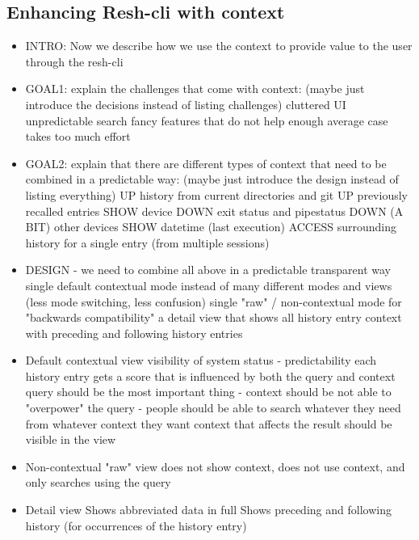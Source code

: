 \documentclass[thesis=M,english]{FITthesis}[2012/10/20]
\begin{document}
\subsection{Enhancing Resh-cli with context}

\begin{itemize}
    \item INTRO: Now we describe how we use the context to provide value to the user through the resh-cli
    \item GOAL1: explain the challenges that come with context: (maybe just introduce the decisions instead of listing challenges)
    \subitem cluttered UI
    \subitem unpredictable search
    \subitem fancy features that do not help enough
    \subitem average case takes too much effort
    
    \item GOAL2: explain that there are different types of context that need to be combined in a predictable way: (maybe just introduce the design instead of listing everything)
    \subitem UP history from current directories and git
    \subitem UP previously recalled entries
    \subitem SHOW device
    \subitem DOWN exit status and pipestatus
    \subitem DOWN (A BIT) other devices
    \subitem SHOW datetime (last execution)
    \subitem ACCESS surrounding history for a single entry (from multiple sessions)
    \item DESIGN - we need to combine all above in a predictable transparent way
    \subitem single default contextual mode instead of many different modes and views (less mode switching, less confusion)
    \subitem single "raw" / non-contextual mode for "backwards compatibility"
    \subitem a detail view that shows all history entry context with preceding and following history entries
    \item Default contextual view
    \subitem visibility of system status - predictability
    \subitem each history entry gets a score that is influenced by both the query and context
    \subitem query should be the most important thing - context should be not able to "overpower" the query - people should be able to search whatever they need from whatever context they want
    \subitem context that affects the result should be visible in the view
    \item Non-contextual "raw" view
    \subitem does not show context, does not use context, and only searches using the query
    \item Detail view
    \subitem Shows abbreviated data in full
    \subitem Shows preceding and following history (for occurrences of the history entry)
\end{itemize}
\end{document}
